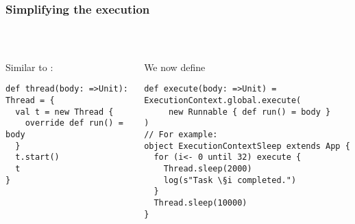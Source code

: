 \documentclass[aspectratio=169]{beamer}
\begin{document}
\begin{frame}[fragile]\frametitle{Simplifying the execution}
~\\[-8mm]
\begin{columns}[t]
\begin{column}{0.45\textwidth}
Similar to :

\begin{lstlisting}[emph={thread,run,start}]
def thread(body: =>Unit): Thread = {
  val t = new Thread {
    override def run() = body
  }
  t.start()
  t
}
\end{lstlisting}
\end{column}
\begin{column}{0.56\textwidth}
We now define \alert{}

\begin{lstlisting}[emph={execute,sleep,log,global}]
def execute(body: =>Unit) = ExecutionContext.global.execute(
     new Runnable { def run() = body }
)
// For example:
object ExecutionContextSleep extends App {
  for (i<- 0 until 32) execute {
    Thread.sleep(2000)
    log(s"Task \§i completed.")
  }
  Thread.sleep(10000)
}
\end{lstlisting}
\end{column}
\end{columns}
\end{frame}
\end{document}
